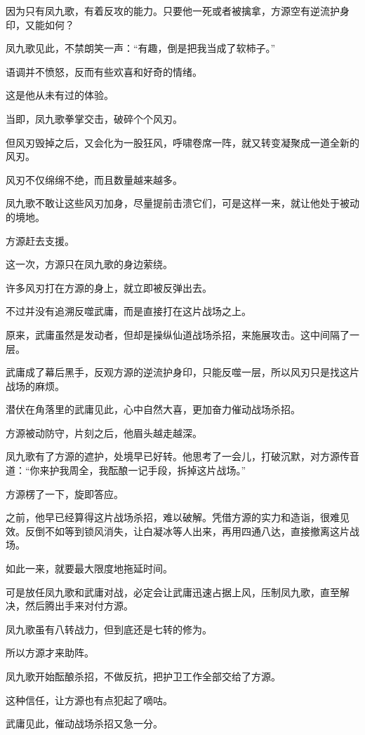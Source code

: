 \begin{this_body}
因为只有凤九歌，有着反攻的能力。只要他一死或者被擒拿，方源空有逆流护身印，又能如何？

凤九歌见此，不禁朗笑一声：“有趣，倒是把我当成了软柿子。”

语调并不愤怒，反而有些欢喜和好奇的情绪。

这是他从未有过的体验。

当即，凤九歌拳掌交击，破碎个个风刃。

但风刃毁掉之后，又会化为一股狂风，呼啸卷席一阵，就又转变凝聚成一道全新的风刃。

风刃不仅绵绵不绝，而且数量越来越多。

凤九歌不敢让这些风刃加身，尽量提前击溃它们，可是这样一来，就让他处于被动的境地。

方源赶去支援。

这一次，方源只在凤九歌的身边萦绕。

许多风刃打在方源的身上，就立即被反弹出去。

不过并没有追溯反噬武庸，而是直接打在这片战场之上。

原来，武庸虽然是发动者，但却是操纵仙道战场杀招，来施展攻击。这中间隔了一层。

武庸成了幕后黑手，反观方源的逆流护身印，只能反噬一层，所以风刃只是找这片战场的麻烦。

潜伏在角落里的武庸见此，心中自然大喜，更加奋力催动战场杀招。

方源被动防守，片刻之后，他眉头越走越深。

凤九歌有了方源的遮护，处境早已好转。他思考了一会儿，打破沉默，对方源传音道：“你来护我周全，我酝酿一记手段，拆掉这片战场。”

方源楞了一下，旋即答应。

之前，他早已经算得这片战场杀招，难以破解。凭借方源的实力和造诣，很难见效。反倒不如等到锁风消失，让白凝冰等人出来，再用四通八达，直接撤离这片战场。

如此一来，就要最大限度地拖延时间。

可是放任凤九歌和武庸对战，必定会让武庸迅速占据上风，压制凤九歌，直至解决，然后腾出手来对付方源。

凤九歌虽有八转战力，但到底还是七转的修为。

所以方源才来助阵。

凤九歌开始酝酿杀招，不做反抗，把护卫工作全部交给了方源。

这种信任，让方源也有点犯起了嘀咕。

武庸见此，催动战场杀招又急一分。


\end{this_body}
